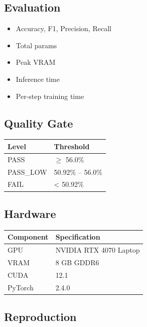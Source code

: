 \subsection{Evaluation}

\begin{itemize}
\item Accuracy, F1, Precision, Recall
\item Total params
\item Peak VRAM
\item Inference time
\item Per-step training time

\end{itemize}
\subsection{Quality Gate}

\begin{table}[H]
\centering
\small
\begin{tabular}{ll}
\toprule
\textbf{Level} & \textbf{Threshold} \\
\midrule
PASS & $\ge$ 56.0\% \\
PASS\_LOW & 50.92\% -- 56.0\% \\
FAIL & \textless{} 50.92\% \\
\bottomrule
\end{tabular}
\end{table}

\subsection{Hardware}

\begin{table}[H]
\centering
\small
\begin{tabular}{ll}
\toprule
\textbf{Component} & \textbf{Specification} \\
\midrule
GPU & NVIDIA RTX 4070 Laptop \\
VRAM & 8 GB GDDR6 \\
CUDA & 12.1 \\
PyTorch & 2.4.0 \\
\bottomrule
\end{tabular}
\end{table}

\subsection{Reproduction}

